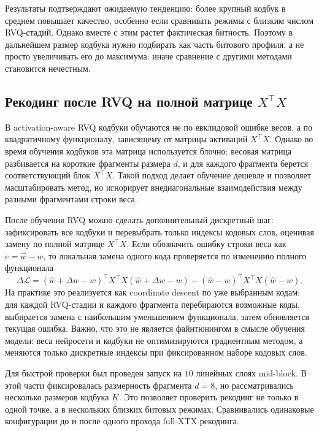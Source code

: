 \documentclass[a4paper,12pt]{article}
\begin{document}
Результаты подтверждают ожидаемую тенденцию: более крупный кодбук в среднем повышает качество, особенно если сравнивать режимы с близким числом RVQ-стадий. Однако вместе с этим растет фактическая битность. Поэтому в дальнейшем размер кодбука нужно подбирать как часть битового профиля, а не просто увеличивать его до максимума: иначе сравнение с другими методами становится нечестным.

\subsection{Рекодинг после RVQ на полной матрице $X^\top X$}

В activation-aware RVQ кодбуки обучаются не по евклидовой ошибке весов, а по квадратичному функционалу, зависящему от матрицы активаций $X^\top X$. Однако во время обучения кодбуков эта матрица используется блочно: весовая матрица разбивается на короткие фрагменты размера $d$, и для каждого фрагмента берется соответствующий блок $X^\top X$. Такой подход делает обучение дешевле и позволяет масштабировать метод, но игнорирует внедиагональные взаимодействия между разными фрагментами строки веса.

После обучения RVQ можно сделать дополнительный дискретный шаг: зафиксировать все кодбуки и перевыбрать только индексы кодовых слов, оценивая замену по полной матрице $X^\top X$. Если обозначить ошибку строки веса как $e = \hat w - w$, то локальная замена одного кода проверяется по изменению полного функционала
\[
    \Delta \mathcal{L}
    =
    (\hat w + \Delta w - w)^\top X^\top X(\hat w + \Delta w - w)
    -
    (\hat w - w)^\top X^\top X(\hat w - w).
\]
На практике это реализуется как coordinate descent по уже выбранным кодам: для каждой RVQ-стадии и каждого фрагмента перебираются возможные коды, выбирается замена с наибольшим уменьшением функционала, затем обновляется текущая ошибка. Важно, что это не является файнтюнингом в смысле обучения модели: веса нейросети и кодбуки не оптимизируются градиентным методом, а меняются только дискретные индексы при фиксированном наборе кодовых слов.

Для быстрой проверки был проведен запуск на $10$ линейных слоях mid-block. В этой части фиксировалась размерность фрагмента $d=8$, но рассматривались несколько размеров кодбука $K$. Это позволяет проверить рекодинг не только в одной точке, а в нескольких близких битовых режимах. Сравнивались одинаковые конфигурации до и после одного прохода full-XTX рекодинга.
\end{document}
